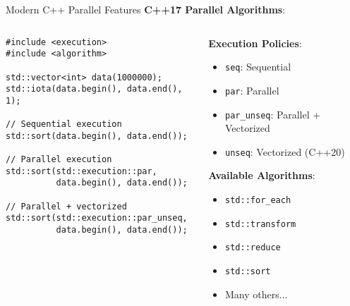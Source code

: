\begin{frame}[fragile]{ Modern C++ Parallel Features}
	\textbf{C++17 Parallel Algorithms}:
	\begin{columns}
		\begin{column}{0.6\textwidth}
			\begin{verbatim}
#include <execution>
#include <algorithm>

std::vector<int> data(1000000);
std::iota(data.begin(), data.end(), 1);

// Sequential execution
std::sort(data.begin(), data.end());

// Parallel execution
std::sort(std::execution::par,
          data.begin(), data.end());

// Parallel + vectorized
std::sort(std::execution::par_unseq,
          data.begin(), data.end());
			\end{verbatim}
		\end{column}
		\begin{column}{0.4\textwidth}
			\textbf{Execution Policies}:
			\begin{itemize}
				\item \texttt{seq}: Sequential
				\item \texttt{par}: Parallel
				\item \texttt{par\_unseq}: Parallel + Vectorized
				\item \texttt{unseq}: Vectorized (C++20)
			\end{itemize}

			\vspace{1em}
			\textbf{Available Algorithms}:
			\begin{itemize}
				\item \texttt{std::for\_each}
				\item \texttt{std::transform}
				\item \texttt{std::reduce}
				\item \texttt{std::sort}
				\item Many others...
			\end{itemize}
		\end{column}
	\end{columns}
\end{frame}
